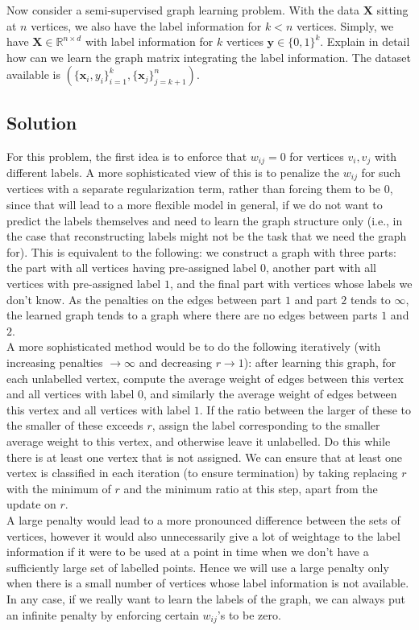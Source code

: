 \documentclass[a4paper]{article}
\newcommand{\nl}{\vspace{0.2cm}\\}
\newcommand{\mf}{\mathbf}
\newcommand{\R}{\mathbb{R}}
\begin{document}
Now consider a semi-supervised graph learning problem. With the data $\mf{X}$ sitting at $n$ vertices, we also have the label information for $k < n$ vertices. Simply, we have $\mf{X} \in \R^{n \times
d}$ with label information for $k$ vertices $\mf{y} \in \{0, 1\}^k$. Explain in detail how can we learn the graph matrix integrating the label information. The dataset available is
$\left(\{\mf{x}_i, y_i\}_{i = 1}^k, \{\mf{x}_j\}_{j = k + 1}^n\right)$.

\subsection{Solution}

For this problem, the first idea is to enforce that $w_{ij} = 0$ for vertices $v_i, v_j$ with different labels. A more sophisticated view of this is to penalize the $w_{ij}$ for such vertices
with a separate regularization term, rather than forcing them to be $0$, since that will lead to a more flexible model in general, if we do not want to predict the labels themselves and
need to learn the graph structure only (i.e., in the case that reconstructing labels might not be the task that we need the graph for). This is equivalent to the following: we construct a graph with
three parts: the part with all vertices having pre-assigned label $0$, another part with all vertices with pre-assigned label $1$, and the final part with vertices whose labels we don't know. As the
penalties on the edges between part $1$ and part $2$ tends to $\infty$, the learned graph tends to a graph where there are no edges between parts $1$ and $2$.\nl
A more sophisticated method would be to do the following iteratively (with increasing penalties $\to \infty$ and decreasing $r \to 1$): after learning this graph, for each unlabelled vertex, compute
the average weight of edges between this vertex and all vertices with label $0$, and similarly the average weight of edges between this vertex and all vertices with label $1$. If the ratio between
the larger of these to the smaller of these exceeds $r$, assign the label corresponding to the smaller average weight to this vertex, and otherwise leave it unlabelled. Do this while
there is at least one vertex that is not assigned.
We can ensure that at least one vertex is classified in each iteration (to ensure termination) by taking replacing $r$ with the minimum of $r$ and the minimum ratio at this step, apart from the
update on $r$.\nl
A large penalty would lead to a more pronounced difference between the sets of vertices, however it would also unnecessarily give a lot of weightage to the label information if it were to be
used at a point in time when we don't have a sufficiently large set of labelled points. Hence we will use a large penalty only when there is a small number of vertices whose label information is not
available. In any case, if we really want to learn the labels of the graph, we can always put an infinite penalty by enforcing certain $w_{ij}$'s to be zero.
\end{document}
